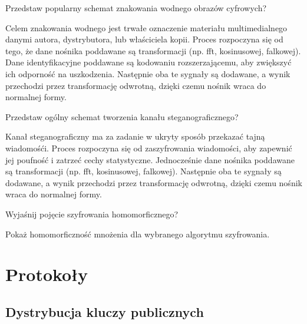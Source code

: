 \documentclass[answers,11pt]{exam}
\begin{document}
\begin{questions}
\question Przedstaw popularny schemat znakowania wodnego obrazów cyfrowych?
\begin{solution}
Celem znakowania wodnego jest trwałe oznaczenie materiału multimedialnego danymi autora, dystrybutora, lub właściciela kopii. Proces rozpoczyna się od tego, że dane nośnika poddawane są transformacji (np. fft, kosinusowej, falkowej). Dane identyfikacyjne poddawane są kodowaniu rozszerzającemu, aby zwiększyć ich odporność na uszkodzenia. Następnie oba te sygnały są dodawane, a wynik przechodzi przez transformację odwrotną, dzięki czemu nośnik wraca do normalnej formy.
\end{solution}

\question Przedstaw ogólny schemat tworzenia kanału steganograficznego?
\begin{solution}
Kanał steganograficzny ma za zadanie w ukryty sposób przekazać tajną wiadomośći. Proces rozpoczyna się od zaszyfrowania wiadomości, aby zapewnić jej poufność i zatrzeć cechy statystyczne. Jednocześnie dane nośnika poddawane są transformacji (np. fft, kosinusowej, falkowej). Następnie oba te sygnały są dodawane, a wynik przechodzi przez transformację odwrotną, dzięki czemu nośnik wraca do normalnej formy.
\end{solution}

\question Wyjaśnij pojęcie szyfrowania homomorficznego?

\question Pokaż homomorficzność mnożenia dla wybranego algorytmu szyfrowania.


\end{questions}



\section{Protokoły}

\subsection{Dystrybucja kluczy publicznych}
\end{document}
